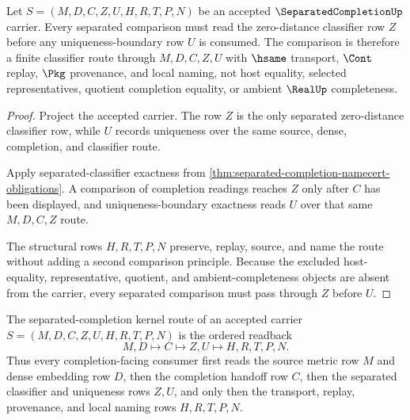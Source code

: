 \begin{theorem}
\label{thm:separated-completion-zero-distance-obligation}
Let $S=(M,D,C,Z,U,H,R,T,P,N)$ be an accepted $\SeparatedCompletionUp$ carrier. Every separated comparison must read the zero-distance classifier row $Z$ before any uniqueness-boundary row $U$ is consumed. The comparison is therefore a finite classifier route through $M,D,C,Z,U$ with $\hsame$ transport, $\Cont$ replay, $\Pkg$ provenance, and local naming, not host equality, selected representatives, quotient completion equality, or ambient $\RealUp$ completeness.
\end{theorem}
\begin{proof}
Project the accepted carrier. The row $Z$ is the only separated zero-distance classifier row, while $U$ records uniqueness over the same source, dense, completion, and classifier route.

Apply separated-classifier exactness from \autoref{thm:separated-completion-namecert-obligations}. A comparison of completion readings reaches $Z$ only after $C$ has been displayed, and uniqueness-boundary exactness reads $U$ over that same $M,D,C,Z$ route.

The structural rows $H,R,T,P,N$ preserve, replay, source, and name the route without adding a second comparison principle. Because the excluded host-equality, representative, quotient, and ambient-completeness objects are absent from the carrier, every separated comparison must pass through $Z$ before $U$.
\end{proof}

\begin{definition}
\label{def:separated-completion-kernel-route}
The separated-completion kernel route of an accepted carrier $S=(M,D,C,Z,U,H,R,T,P,N)$ is the ordered readback
$$
M,D \longmapsto C \longmapsto Z,U \longmapsto H,R,T,P,N .
$$
Thus every completion-facing consumer first reads the source metric row $M$ and dense embedding row $D$, then the completion handoff row $C$, then the separated classifier and uniqueness rows $Z,U$, and only then the transport, replay, provenance, and local naming rows $H,R,T,P,N$.
\end{definition}


